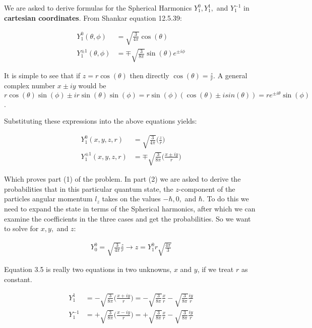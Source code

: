\documentclass[paper=a4, fontsize=11pt]{scrartcl} %
\numberwithin{equation}{section} %
\numberwithin{figure}{section} %
\numberwithin{table}{section} %
\begin{document}
We are asked to derive formulas for the Spherical Harmonics $Y^0_1, Y^1_1,$ and $Y^{-1}_{1}$ in \textbf{cartesian coordinates}. From Shankar equation 12.5.39:

\begin{align}
Y^0_1 (\theta, \phi) &= \sqrt{\frac{3}{4 \pi}} \cos(\theta) \\
Y^{\pm 1}_1 (\theta, \phi) &= \mp \sqrt{\frac{3}{8 \pi}} \sin(\theta) e^{\pm i \phi} 
\end{align}

It is simple to see that if $z = r \cos(\theta)$ then directly $\cos(\theta) = \frac{z}{r}$. A general complex number $x \pm iy$ would be $r\cos(\theta)\sin(\phi) \pm i r\sin(\theta)\sin(\phi) = r\sin(\phi)(\cos(\theta) \pm i sin(\theta)) =  r e^{\pm i \theta}\sin(\phi)$.

Substituting these expressions into the above equations yields:

\begin{align}
Y^0_1 (x,y,z,r) &= \sqrt{\frac{3}{4 \pi}} \bigg( \frac{z}{r} \bigg) \\
Y^{\pm 1}_1 (x,y,z,r) &= \mp \sqrt{\frac{3}{8 \pi}} \bigg( \frac{x \pm iy}{r} \bigg)
\end{align}

Which proves part (1) of the problem. In part (2) we are asked to derive the probabilities that in this particular quantum state, the $z$-component of the particles angular momentum $l_z$ takes on the values $-\hbar, 0,$ and $\hbar$. To do this we need to expand the state in terms of the Spherical harmonics, after which we can examine the coefficients in the three cases and get the probabilities. So we want to solve for $x,y,$ and $z$:

\begin{align}
Y^0_0 = \sqrt{\frac{3}{4 \pi}} \frac{z}{r} \rightarrow z = Y^0_1 r \sqrt{\frac{4 \pi}{3}}  
\end{align}

Equation 3.5 is really two equations in two unknowns, $x$ and $y$, if we treat $r$ as constant.

\begin{align}
Y^1_1 &= - \sqrt{\frac{3}{8 \pi}} \bigg(\frac{x + iy}{r} \bigg)  = - \sqrt{\frac{3}{8 \pi}} \frac{x}{r} - \sqrt{\frac{3}{8 \pi}} \frac{iy}{r}  \\
Y^{-1}_1 &= + \sqrt{\frac{3}{8 \pi}} \bigg(\frac{x - iy}{r} \bigg) = + \sqrt{\frac{3}{8 \pi}} \frac{x}{r} - \sqrt{\frac{3}{8 \pi}} \frac{iy}{r} \\
\end{align}  
\end{document}

